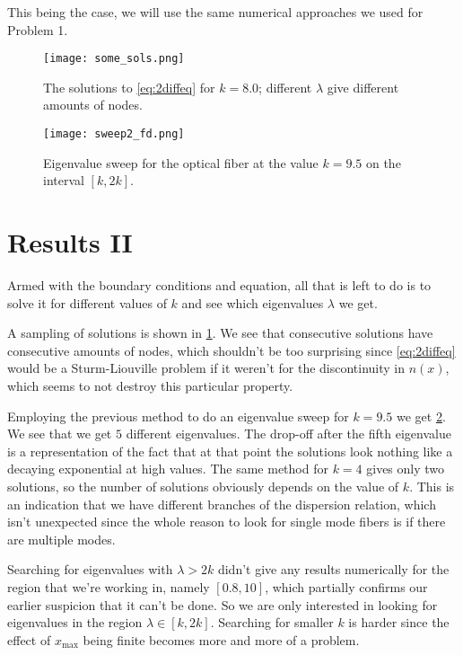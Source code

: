 \documentclass[10pt,a4paper,twocolumn]{article}
\begin{document}
This being the case, we will use the same numerical approaches we used for Problem 1.

\begin{figure}[h]
    \centering
    \texttt{[image: some\_sols.png]}
    \caption{The solutions to \cref{eq:2diffeq} for $k=8.0$; different $\lambda$ give different amounts of nodes.}
    \label{fig:some_sols}
\end{figure}

\begin{figure}[!h]
    \centering
    \texttt{[image: sweep2\_fd.png]}
    \caption{Eigenvalue sweep for the optical fiber at the value $k=9.5$ on the interval $[k, 2k]$.}
    \label{fig:sweep2_fd}
\end{figure}

\section{Results II}

Armed with the boundary conditions and equation, all that is left to do is to solve it for different values of $k$ and see which eigenvalues $\lambda$ we get.

A sampling of solutions is shown in \cref{fig:some_sols}. We see that consecutive solutions have consecutive amounts of nodes, which shouldn't be too surprising since \cref{eq:2diffeq} would be a Sturm-Liouville problem if it weren't for the discontinuity in $n(x)$, which seems to not destroy this particular property.

Employing the previous method to do an eigenvalue sweep for $k = 9.5$ we get \cref{fig:sweep2_fd}. We see that we get $5$ different eigenvalues. The drop-off after the fifth eigenvalue is a representation of the fact that at that point the solutions look nothing like a decaying exponential at high values. The same method for $k = 4$ gives only two solutions, so the number of solutions obviously depends on the value of $k$. This is an indication that we have different branches of the dispersion relation, which isn't unexpected since the whole reason to look for single mode fibers is if there are multiple modes.

Searching for eigenvalues with $\lambda > 2k$ didn't give any results numerically for the region that we're working in, namely $[0.8, 10]$, which partially confirms our earlier suspicion that it can't be done. So we are only interested in looking for eigenvalues in the region $\lambda \in [k, 2k]$. Searching for smaller $k$ is harder since the effect of $x_{\mathrm{max}}$ being finite becomes more and more of a problem.
\end{document}
